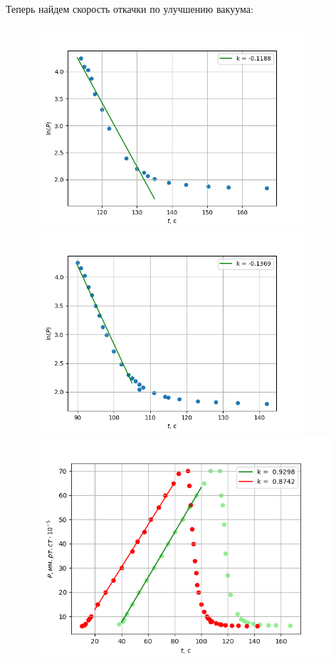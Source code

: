 Теперь найдем скорость откачки по улучшению вакуума:
\begin{figure}[h!]
    \begin{minipage}{0.5\textwidth}
        \includegraphics[width=10cm]{plotBetter1.png}
    \end{minipage}
    \begin{minipage}{0.5\textwidth}
        \includegraphics[width=10cm]{plotBetter2.png}
    \end{minipage}

    \begin{minipage}{0.99\textwidth}
        \centering
        \includegraphics[width=11cm]{ALLPLOT.png}
    \end{minipage}
\end{figure}

